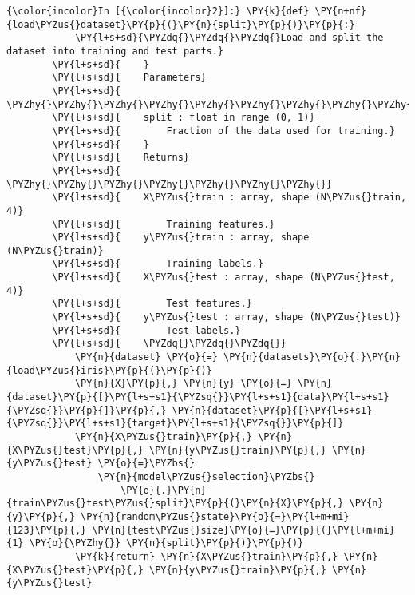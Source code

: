     \begin{Verbatim}[commandchars=\\\{\}]
{\color{incolor}In [{\color{incolor}2}]:} \PY{k}{def} \PY{n+nf}{load\PYZus{}dataset}\PY{p}{(}\PY{n}{split}\PY{p}{)}\PY{p}{:}
            \PY{l+s+sd}{\PYZdq{}\PYZdq{}\PYZdq{}Load and split the dataset into training and test parts.}
        \PY{l+s+sd}{    }
        \PY{l+s+sd}{    Parameters}
        \PY{l+s+sd}{    \PYZhy{}\PYZhy{}\PYZhy{}\PYZhy{}\PYZhy{}\PYZhy{}\PYZhy{}\PYZhy{}\PYZhy{}\PYZhy{}}
        \PY{l+s+sd}{    split : float in range (0, 1)}
        \PY{l+s+sd}{        Fraction of the data used for training.}
        \PY{l+s+sd}{    }
        \PY{l+s+sd}{    Returns}
        \PY{l+s+sd}{    \PYZhy{}\PYZhy{}\PYZhy{}\PYZhy{}\PYZhy{}\PYZhy{}\PYZhy{}}
        \PY{l+s+sd}{    X\PYZus{}train : array, shape (N\PYZus{}train, 4)}
        \PY{l+s+sd}{        Training features.}
        \PY{l+s+sd}{    y\PYZus{}train : array, shape (N\PYZus{}train)}
        \PY{l+s+sd}{        Training labels.}
        \PY{l+s+sd}{    X\PYZus{}test : array, shape (N\PYZus{}test, 4)}
        \PY{l+s+sd}{        Test features.}
        \PY{l+s+sd}{    y\PYZus{}test : array, shape (N\PYZus{}test)}
        \PY{l+s+sd}{        Test labels.}
        \PY{l+s+sd}{    \PYZdq{}\PYZdq{}\PYZdq{}}
            \PY{n}{dataset} \PY{o}{=} \PY{n}{datasets}\PY{o}{.}\PY{n}{load\PYZus{}iris}\PY{p}{(}\PY{p}{)}
            \PY{n}{X}\PY{p}{,} \PY{n}{y} \PY{o}{=} \PY{n}{dataset}\PY{p}{[}\PY{l+s+s1}{\PYZsq{}}\PY{l+s+s1}{data}\PY{l+s+s1}{\PYZsq{}}\PY{p}{]}\PY{p}{,} \PY{n}{dataset}\PY{p}{[}\PY{l+s+s1}{\PYZsq{}}\PY{l+s+s1}{target}\PY{l+s+s1}{\PYZsq{}}\PY{p}{]}
            \PY{n}{X\PYZus{}train}\PY{p}{,} \PY{n}{X\PYZus{}test}\PY{p}{,} \PY{n}{y\PYZus{}train}\PY{p}{,} \PY{n}{y\PYZus{}test} \PY{o}{=}\PYZbs{}
                \PY{n}{model\PYZus{}selection}\PYZbs{}
                    \PY{o}{.}\PY{n}{train\PYZus{}test\PYZus{}split}\PY{p}{(}\PY{n}{X}\PY{p}{,} \PY{n}{y}\PY{p}{,} \PY{n}{random\PYZus{}state}\PY{o}{=}\PY{l+m+mi}{123}\PY{p}{,} \PY{n}{test\PYZus{}size}\PY{o}{=}\PY{p}{(}\PY{l+m+mi}{1} \PY{o}{\PYZhy{}} \PY{n}{split}\PY{p}{)}\PY{p}{)}
            \PY{k}{return} \PY{n}{X\PYZus{}train}\PY{p}{,} \PY{n}{X\PYZus{}test}\PY{p}{,} \PY{n}{y\PYZus{}train}\PY{p}{,} \PY{n}{y\PYZus{}test}
\end{Verbatim}


